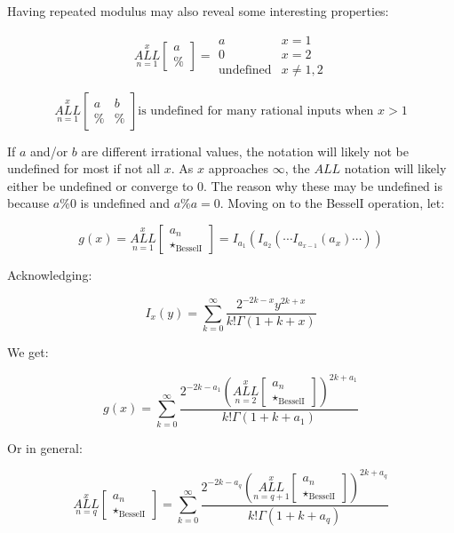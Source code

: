 \documentclass{article}
\begin{document}
Having repeated modulus may also reveal some interesting properties:

$$ \underset{n=1}{\overset{x}{ALL}} \begin{bmatrix}
a \\
\%
\end{bmatrix} = \begin{array}{ll} a & x=1 \\ 0 & x=2 \\ \text{undefined} & x \neq 1,2 \end{array} $$

$$ \underset{n=1}{\overset{x}{ALL}} \begin{bmatrix}
a & b  \\
\% & \%
\end{bmatrix} \text{is undefined for many rational inputs when }x > 1$$

If $a$ and/or $b$ are different irrational values, the notation will likely not be undefined for most if not all $x$. As $x$ approaches $\infty$, the $ALL$ notation will likely either be undefined or converge to 0. The reason why these may be undefined is because $a\%0$ is undefined and $a\%a=0$. Moving on to the BesselI operation, let:

$$g(x) = \underset{n=1}{\overset{x}{ALL}} \begin{bmatrix}
a_n \\
\star_{\text{BesselI}}
\end{bmatrix}=I_{a_1}(I_{a_2}(\cdots I_{a_{x-1}}(a_x) \cdots))$$

Acknowledging:

$$I_x(y) = \underset{k=0}{\overset{\infty}{\sum}} \frac{2^{-2k-x}y^{2k+x}}{k! \Gamma(1+k+x)}$$

We get:

$$g(x)=\underset{k=0}{\overset{\infty}{\sum}} \frac{2^{-2k-a_1}(\underset{n=2}{\overset{x}{ALL}} \begin{bmatrix}
a_n \\
\star_{\text{BesselI}}
\end{bmatrix})^{2k+a_1}}{k! \Gamma(1+k+a_1)}$$

Or in general:

$$\underset{n=q}{\overset{x}{ALL}} \begin{bmatrix}
a_n \\
\star_{\text{BesselI}}
\end{bmatrix}=\underset{k=0}{\overset{\infty}{\sum}} \frac{2^{-2k-a_q}(\underset{n=q+1}{\overset{x}{ALL}} \begin{bmatrix}
a_n \\
\star_{\text{BesselI}}
\end{bmatrix})^{2k+a_q}}{k! \Gamma(1+k+a_q)}$$
\end{document}
